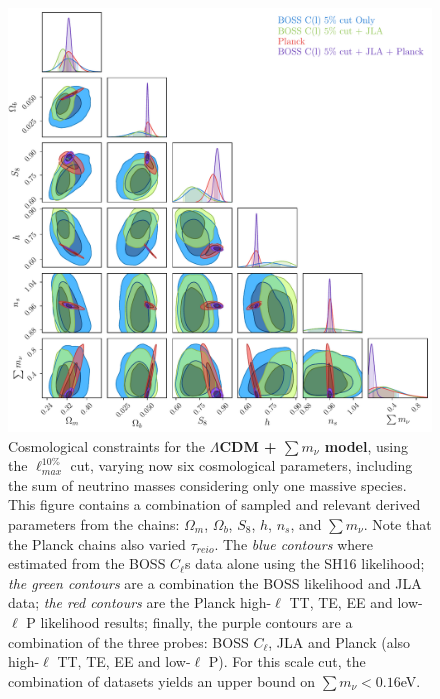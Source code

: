 \begin{figure}
\begin{center}
\includegraphics[width=\textwidth]{BOSS-FIGS/1Spec_Neutrino_NewPrior_LCDM_5pc.pdf}
\caption[Cosmological constraints for the $\Lambda$CDM + $\sum m_{\nu}$ model, using the $\ell_{max}^{10\%}$ cut]{Cosmological constraints for the \textbf{$\Lambda$CDM + $\sum m_{\nu}$ model}, using the $\ell_{max}^{10\%}$ cut, varying now six cosmological parameters, including the sum of neutrino masses considering only one massive species. This figure contains a combination of sampled and relevant derived parameters from the chains: $\Omega_m$, $\Omega_b$, $S_8$, $h$, $n_s$, and $\sum m_{\nu}$. Note that the Planck chains also varied $\tau_{reio}$. The \textit{blue contours} where estimated from the BOSS $C_{\ell}$s data alone using the SH16 likelihood; \textit{the green contours} are a combination the BOSS likelihood and JLA data; \textit{the red contours} are the Planck high-$\ell$ TT, TE, EE and low-$\ell$ P likelihood results; finally, the purple contours are a combination of the three probes: BOSS $C_{\ell}$, JLA and Planck (also high-$\ell$ TT, TE, EE and low-$\ell$ P). For this scale cut, the combination of datasets yields an upper bound on $\sum m_{\nu} < 0.16$eV.}
\label{fig:nuCDM10pc}
\end{center}
\end{figure}



